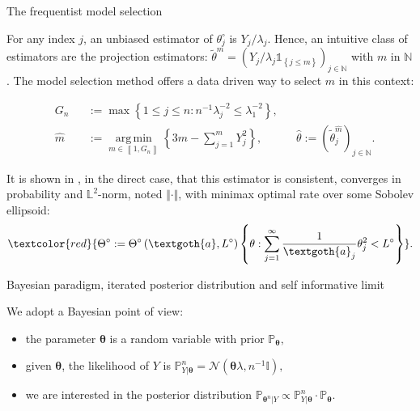 \documentclass[final,hyperref={pdfpagelabels=false}]{beamer}
\DeclareMathOperator*{\argmin}{arg\,min}
\begin{document}
\begin{frame}[t]
\begin{columns}[t]
\begin{column}{.30\textwidth}
\begin{block}{\rule{0pt}{2.5ex} The frequentist model selection}
For any index $j$, an unbiased estimator of $\theta^{\circ}_{j}$ is $Y_{j}/\lambda_{j}$.
Hence, an intuitive class of estimators are the projection estimators: $\tilde{\theta}^{m} = \left(Y_{j}/\lambda_{j} \mathds{1}_{\left\{j \leq m\right\}}\right)_{j \in \mathbb{N}}$ with $m$ in $\mathbb{N}$.
The model selection method offers a data driven way to select $m$ in this context:

\textcolor{red!90!black}{
\begin{alignat*}{3}
&G_{n} && := \max\left\{1 \leq j \leq n : n^{-1} \lambda_{j}^{-2} \leq \lambda_{1}^{-2}\right\}, &&\\
&\widehat{m} && := \argmin\limits_{m \in \left\llbracket 1 , G_{n} \right\rrbracket}\left\{3 m -\sum\limits_{j = 1}^{m} Y_{j}^{2}\right\}, &&\widehat{\theta} := \left( \tilde{\theta}^{\widehat{m}}_{j} \right)_{j \in \mathbb{N}}.
\end{alignat*}}

\bigskip

It is shown in \citet{PM}, in the direct case, that this estimator is \textcolor{red!90!black}{consistent}, converges in probability and $\mathbb{L}^{2}$-norm, noted $\Vert \cdot \Vert$, with \textcolor{red!90!black}{minimax optimal rate} over some Sobolev ellipsoid:
\[\textcolor{red}{\Theta^{\circ} := \Theta^{\circ}\left(\textgoth{a}, L^{\circ}\right) \left\{\theta : \sum\limits_{j = 1}^{\infty} \frac{1}{\textgoth{a}_{j}}\theta_{j}^{2} < L^{\circ}\right\}}.\]
\end{block}

\begin{block}{\rule{0pt}{2.5ex} Bayesian paradigm, iterated posterior distribution and self informative limit}
We adopt a \textcolor{red!90!black}{Bayesian point of view}:
\begin{itemize}
\item the parameter $\boldsymbol{\theta}$ is a random variable with prior $\mathbb{P}_{\boldsymbol{\theta}},$
\item given $\boldsymbol{\theta}$, the likelihood of $Y$ is $\mathbb{P}_{Y \vert \boldsymbol{\theta}}^{n} = \mathcal{N}\left(\boldsymbol{\theta} \lambda, n^{-1} \mathbb{I}\right),$
\item we are interested in the posterior distribution $\mathbb{P}_{\boldsymbol{\theta}^{n} \vert Y} \propto \mathbb{P}_{Y \vert \boldsymbol{\theta}}^{n} \cdot \mathbb{P}_{\boldsymbol{\theta}}.$
\end{itemize}


\end{block}
\end{column}
\end{columns}
\end{frame}
\end{document}
